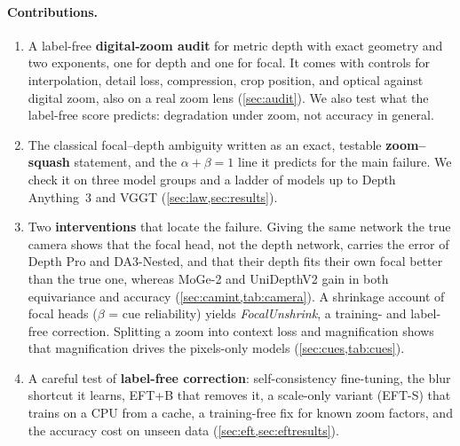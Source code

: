 \paragraph{Contributions.}
\begin{enumerate}\setlength{\itemsep}{0pt}
  \item A label-free \textbf{digital-zoom audit} for metric depth with exact geometry and two exponents,
        one for depth and one for focal. It comes with controls for interpolation, detail loss,
        compression, crop position, and optical against digital zoom, also on a real zoom lens (\cref{sec:audit}). We also test what the
        label-free score predicts: degradation under zoom, not accuracy in general.
  \item The classical focal--depth ambiguity written as an exact, testable \textbf{zoom--squash} statement, and the
        $\alpha+\beta=1$ line it predicts for the main failure. We check it on three model groups and a ladder of models up to Depth Anything~3 and VGGT
        (\cref{sec:law,sec:results}).
  \item Two \textbf{interventions} that locate the failure. Giving the same network the true camera shows
        that the focal head, not the depth network, carries the error of Depth Pro and DA3-Nested, and that
        their depth fits their own focal better than the true one, whereas MoGe-2 and UniDepthV2 gain in both
        equivariance and accuracy (\cref{sec:camint,tab:camera}). A shrinkage account of focal heads
        ($\beta$ = cue reliability) yields \emph{FocalUnshrink}, a training- and label-free correction. Splitting a zoom into context loss and
        magnification shows that magnification drives the pixels-only models (\cref{sec:cues,tab:cues}).
  \item A careful test of \textbf{label-free correction}: self-consistency fine-tuning, the blur shortcut
        it learns, EFT+B that removes it, a scale-only variant (EFT-S) that trains on a CPU from a cache,
        a training-free fix for known zoom factors, and the accuracy cost on unseen data
        (\cref{sec:eft,sec:eftresults}).
\end{enumerate}
